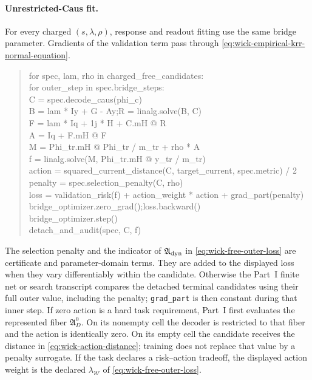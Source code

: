 \documentclass[11pt]{article}
\numberwithin{section}{part}
\theoremstyle{plain}
\theoremstyle{definition}
\theoremstyle{remark}
\begin{document}
\paragraph{Unrestricted-Caus fit.}
For every charged \((s,\lambda,\rho)\), response and readout fitting use the
same bridge parameter.  Gradients of the validation term pass through
\eqref{eq:wick-empirical-krr-normal-equation}.
\begin{quote}
\small\ttfamily
for spec, lam, rho in charged\_free\_candidates:\\
\quad for outer\_step in spec.bridge\_steps:\\
\qquad C = spec.decode\_caus(phi\_c)\\
\qquad B = lam * Iy + G - Ay;\quad R = linalg.solve(B, C)\\
\qquad F = lam * Iq + 1j * H + C.mH @ R\\
\qquad A = Iq + F.mH @ F\\
\qquad M = Phi\_tr.mH @ Phi\_tr / m\_tr + rho * A\\
\qquad f = linalg.solve(M, Phi\_tr.mH @ y\_tr / m\_tr)\\
\qquad action = squared\_current\_distance(C, target\_current, spec.metric) / 2\\
\qquad penalty = spec.selection\_penalty(C, rho)\\
\qquad loss = validation\_risk(f) + action\_weight * action + grad\_part(penalty)\\
\qquad bridge\_optimizer.zero\_grad();\quad loss.backward()\\
\qquad bridge\_optimizer.step()\\
\quad detach\_and\_audit(spec, C, f)
\end{quote}
The selection penalty and the indicator of
\(\mathfrak A_{\rm dyn}\) in \eqref{eq:wick-free-outer-loss} are certificate
and parameter-domain terms.  They are added to the displayed loss when they
vary differentiably within the candidate.  Otherwise the Part~I finite net or
search transcript compares the detached terminal candidates using their full
outer value, including the penalty; \texttt{grad\_part} is then constant
during that inner step.  If zero action is a hard task
requirement, Part~I first evaluates the represented fiber
\(\mathfrak A_D^0\).  On its nonempty cell the decoder is restricted to that
fiber and the action is identically zero.  On its empty cell the candidate
receives the distance in \eqref{eq:wick-action-distance}; training does not
replace that value by a penalty surrogate.  If the task declares a
risk--action tradeoff, the displayed action weight is the declared
\(\lambda_{\mathscr W}\) of \eqref{eq:wick-free-outer-loss}.
\end{document}
